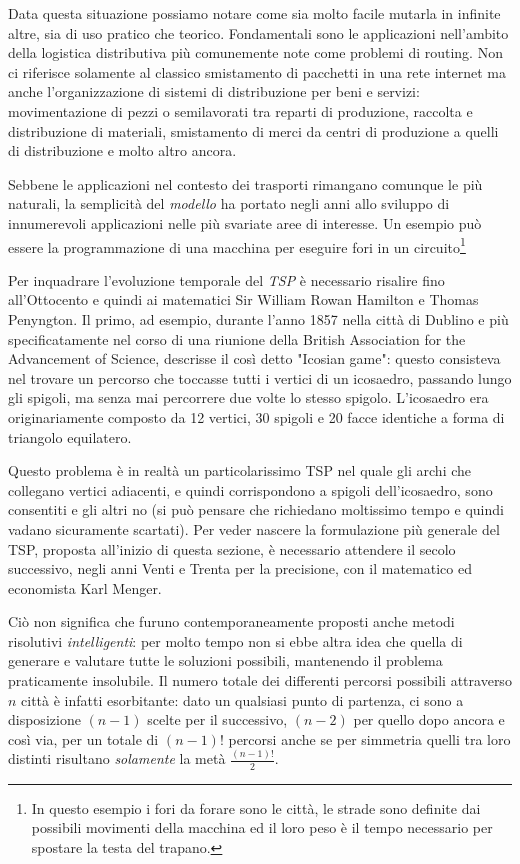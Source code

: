 \documentclass[11pt]{article}
\begin{document}
Data questa situazione possiamo notare come sia molto facile mutarla in infinite altre, sia di uso pratico che teorico. Fondamentali sono le applicazioni nell'ambito della logistica distributiva più comunemente note come problemi di routing. Non ci riferisce solamente al classico smistamento di pacchetti in una rete internet ma anche l’organizzazione di sistemi di distribuzione per beni e servizi: movimentazione di pezzi o semilavorati tra reparti di produzione, raccolta e distribuzione di materiali, smistamento di merci da centri di produzione a quelli di distribuzione e molto altro ancora.

Sebbene le applicazioni nel contesto dei trasporti rimangano comunque le più naturali, la semplicità del \textit{modello} ha portato negli anni allo sviluppo di innumerevoli applicazioni nelle più svariate aree di interesse. Un esempio può essere la programmazione di una macchina per eseguire fori in un circuito\footnote{In questo esempio i fori da forare sono le città, le strade sono definite dai possibili movimenti della macchina ed il loro peso è il tempo necessario per spostare la testa del trapano.}

Per inquadrare l'evoluzione temporale del \textit{TSP} è necessario risalire fino all'Ottocento e quindi ai matematici Sir William Rowan Hamilton e Thomas Penyngton. Il primo, ad esempio, durante l'anno 1857 nella città di Dublino e più specificatamente nel corso di una riunione della British Association for the Advancement of Science, descrisse il così detto  "Icosian game": questo consisteva nel trovare un percorso che toccasse tutti i vertici di un icosaedro, passando lungo gli spigoli, ma senza mai percorrere due volte lo stesso spigolo. L'icosaedro era originariamente composto da 12 vertici, 30 spigoli e 20 facce identiche a forma di triangolo equilatero.

Questo problema è in realtà un particolarissimo TSP nel quale gli archi che collegano vertici adiacenti, e quindi corrispondono a spigoli dell'icosaedro, sono consentiti e gli altri no (si può pensare che richiedano moltissimo tempo e quindi vadano sicuramente scartati). Per veder nascere la formulazione più generale del TSP, proposta all'inizio di questa sezione, è necessario attendere il secolo successivo, negli anni Venti e Trenta per la precisione, con il matematico ed economista Karl Menger.

Ciò non significa che furuno contemporaneamente proposti anche metodi risolutivi \textit{intelligenti}: per molto tempo non si ebbe altra idea che quella di generare e valutare tutte le soluzioni possibili, mantenendo il problema praticamente insolubile. Il numero totale dei differenti percorsi possibili attraverso $n$ città è infatti esorbitante: dato un qualsiasi punto di partenza, ci sono a disposizione $(n - 1)$ scelte per il successivo, $(n - 2)$ per quello dopo ancora e così via, per un totale di $(n - 1)!$ percorsi anche se per simmetria quelli tra loro distinti risultano \textit{solamente} la metà $\frac{(n-1)!}{2}$.
\end{document}
